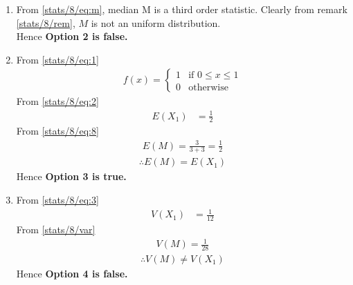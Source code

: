 \begin{enumerate}
        
     \item From \eqref{stats/8/eq:m}, median M is a third order statistic. Clearly from remark \eqref{stats/8/rem}, $M$ is not an uniform distribution.
    \\Hence \textbf{Option 2 is false.}
    \item From \eqref{stats/8/eq:1}
    \begin{align}
        f(x)=
        \begin{cases}
        1 & \text{if } 0\leq x \leq 1\\
        0 & \text{otherwise}
        \end{cases}
    \end{align}
    From \eqref{stats/8/eq:2} 
    \begin{align}
        E(X_1)&=\frac{1}{2}
    \end{align}
    From \eqref{stats/8/eq:8}
    \begin{align}
        E(M)=\frac{3}{3+3}=\frac{1}{2}
    \end{align}
     \begin{align}
          \therefore E(M)=E(X_1)
     \end{align}
       Hence \textbf{Option 3 is true.}
    \item From \eqref{stats/8/eq:3}
    \begin{align}
          V(X_1)&=\frac{1}{12}
    \end{align}
    From \eqref{stats/8/var}
    \begin{align}
        V(M)=\frac{1}{28}
    \end{align}
    \begin{align}
          \therefore V(M)\neq V(X_1)
     \end{align}
       Hence \textbf{Option 4 is false.}
    \end{enumerate}